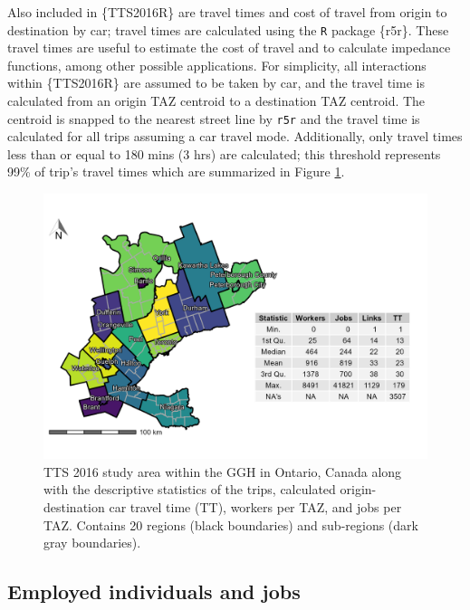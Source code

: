 \documentclass[Royal,times,sageh]{sagej}
\begin{document}
Also included in \{TTS2016R\} are travel times and cost of travel from
origin to destination by car; travel times are calculated using the
\texttt{R} package \{r5r\}. These travel times are useful to estimate
the cost of travel and to calculate impedance functions, among other
possible applications. For simplicity, all interactions within
\{TTS2016R\} are assumed to be taken by car, and the travel time is
calculated from an origin TAZ centroid to a destination TAZ centroid.
The centroid is snapped to the nearest street line by \texttt{r5r} and
the travel time is calculated for all trips assuming a car travel mode.
Additionally, only travel times less than or equal to 180 mins (3 hrs)
are calculated; this threshold represents 99\% of trip's travel times
which are summarized in Figure \ref{fig:TTS-16-survey-area}.

\begin{figure}[H]

{\centering \includegraphics[width=1\linewidth]{images/TTS16-survey-area} 

}

\caption{\label{fig:TTS-16-survey-area}TTS 2016 study area within the GGH in Ontario, Canada along with the descriptive statistics of the trips, calculated origin-destination car travel time (TT), workers per TAZ, and jobs per TAZ. Contains 20 regions (black boundaries) and sub-regions (dark gray boundaries).}\label{fig:TTS-16-survey-area}
\end{figure}

\hypertarget{employed-individuals-and-jobs}{%
\subsection{Employed individuals and
jobs}\label{employed-individuals-and-jobs}}
\end{document}

